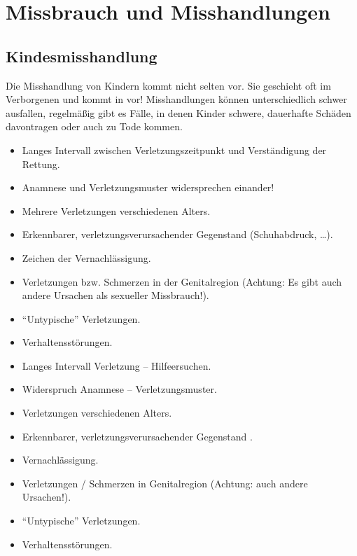 

\section{Missbrauch und Misshandlungen}

\subsection{Kindesmisshandlung}
\label{topic:kindesmisshandlung}

Die Misshandlung von Kindern kommt nicht selten
vor. Sie geschieht oft im Verborgenen und kommt in  vor! Misshandlungen können
unterschiedlich schwer ausfallen, regelmäßig gibt es Fälle,
in denen Kinder schwere, dauerhafte Schäden davontragen oder
auch zu Tode kommen.

{
\begin{itemize}
  \item Langes Intervall zwischen  Verletzungszeitpunkt und Verständigung der
  Rettung.
  \item Anamnese und Verletzungsmuster  widersprechen einander!
  \item Mehrere Verletzungen verschiedenen Alters.
  \item Erkennbarer, verletzungsverursachender Gegenstand (Schuhabdruck,
  \ldots).
  \item Zeichen der Vernachlässigung.
  \item Verletzungen bzw. Schmerzen in der Genitalregion (Achtung: Es gibt auch andere
  Ursachen als sexueller Missbrauch!).
  \item \enquote{Untypische} Verletzungen.
  \item Verhaltensstörungen.
\end{itemize}
}{
\begin{itemize}
  \item Langes Intervall Verletzung -- Hilfeersuchen.
  \item Widerspruch Anamnese -- Verletzungsmuster.
  \item Verletzungen verschiedenen Alters.
  \item Erkennbarer, verletzungsverursachender Gegenstand .
  \item Vernachlässigung.
  \item Verletzungen / Schmerzen in Genitalregion (Achtung: auch andere
  Ursachen!).
  \item \enquote{Untypische} Verletzungen.
  \item Verhaltensstörungen.
\end{itemize}
}{}{}{}

